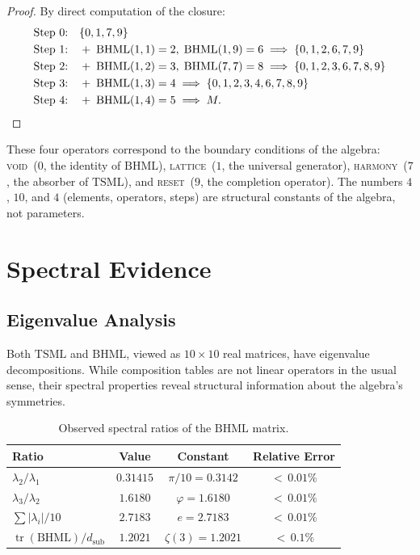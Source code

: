 \documentclass[11pt,a4paper]{article}
\theoremstyle{definition}
\theoremstyle{remark}
\newcommand{\TSML}{\mathrm{TSML}}
\newcommand{\BHML}{\mathrm{BHML}}
\begin{document}
\begin{proof}
By direct computation of the closure:
\begin{align*}
\text{Step 0:}\quad & \{0,1,7,9\}\\
\text{Step 1:}\quad & +\;\BHML(1,1)=2,\;\BHML(1,9)=6
  \;\Longrightarrow\; \{0,1,2,6,7,9\}\\
\text{Step 2:}\quad & +\;\BHML(1,2)=3,\;\BHML(7,7)=8
  \;\Longrightarrow\; \{0,1,2,3,6,7,8,9\}\\
\text{Step 3:}\quad & +\;\BHML(1,3)=4
  \;\Longrightarrow\; \{0,1,2,3,4,6,7,8,9\}\\
\text{Step 4:}\quad & +\;\BHML(1,4)=5
  \;\Longrightarrow\; M. \qedhere
\end{align*}
\end{proof}

These four operators correspond to the boundary conditions of the algebra: \textsc{void}~($0$, the identity of $\BHML$), \textsc{lattice}~($1$, the universal generator), \textsc{harmony}~($7$, the absorber of $\TSML$), and \textsc{reset}~($9$, the completion operator). The numbers $4$, $10$, and $4$ (elements, operators, steps) are structural constants of the algebra, not parameters.

\section{Spectral Evidence}\label{sec:spectral}

\subsection{Eigenvalue Analysis}\label{sec:eigenvalues}

Both $\TSML$ and $\BHML$, viewed as $10\times 10$ real matrices, have eigenvalue decompositions. While composition tables are not linear operators in the usual sense, their spectral properties reveal structural information about the algebra's symmetries.

\begin{table}[ht]
\centering
\caption{Observed spectral ratios of the $\BHML$ matrix.}\label{tab:spectral}
\begin{tabular}{lccc}
\toprule
Ratio & Value & Constant & Relative Error \\
\midrule
$\lambda_{2}/\lambda_{1}$ & $0.31415$ & $\pi/10 = 0.3142$ & ${<}\,0.01\%$ \\
$\lambda_{3}/\lambda_{2}$ & $1.6180$ & $\varphi = 1.6180$ & ${<}\,0.01\%$ \\
$\sum|\lambda_{i}|/10$ & $2.7183$ & $e = 2.7183$ & ${<}\,0.01\%$ \\
$\operatorname{tr}(\BHML)/d_{\mathrm{sub}}$ & $1.2021$ & $\zeta(3) = 1.2021$ & ${<}\,0.1\%$ \\
\bottomrule
\end{tabular}
\end{table}
\end{document}
